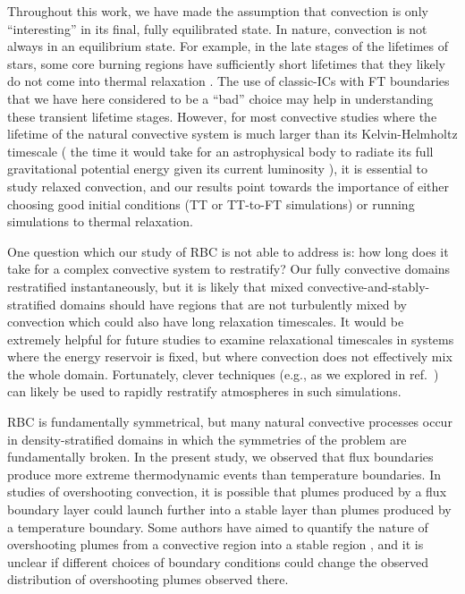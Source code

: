 \documentclass[aps, pre, onecolumn, nofootinbib, notitlepage, groupedaddress, amsfonts, amssymb, amsmath, longbibliography, superscriptaddress]{revtex4-1}
\newcommand{\ea}[1]{{\color{red} #1}}
\begin{document}
Throughout this work, we have made the assumption that convection is only ``interesting'' in its final, fully equilibrated state.
In nature, convection is not always in an equilibrium state.
For example, in the late stages of the lifetimes of stars, some core burning regions have sufficiently short lifetimes that they likely do not come into thermal relaxation \citep{clarkson&all2018, andrassy&all2020}.
The use of classic-ICs with FT boundaries that we have here considered to be a ``bad'' choice may help in understanding these transient lifetime stages.
However, for most convective studies where the lifetime of the natural convective system is much larger than its Kelvin-Helmholtz timescale (\ea{the time it would take for an astrophysical body to radiate its full gravitational potential energy given its current luminosity \cite{carroll&ostlie}}), it is essential to study relaxed convection, and our results point towards the importance of either choosing good initial conditions (TT or TT-to-FT simulations) or running simulations to thermal relaxation.

One question which our study of RBC is not able to address is: how long does it take for a complex convective system to restratify?
Our fully convective domains restratified instantaneously, but it is likely that mixed convective-and-stably-stratified domains \citep{brummell&all2002, kapyla&all2019, pratt&all2017, korre&all2019} should have regions that are not turbulently mixed by convection which could also have long relaxation timescales.
It would be extremely helpful for future studies to examine relaxational timescales in systems where the energy reservoir is fixed, but where convection does not effectively mix the whole domain.
Fortunately, clever techniques (e.g., as we explored in ref.~\cite{anders&all2018}) can likely be used to rapidly restratify atmospheres in such simulations.

RBC is fundamentally symmetrical, but many natural convective processes occur in density-stratified domains in which the symmetries of the problem are fundamentally broken.
In the present study, we observed that flux boundaries produce more extreme thermodynamic events than temperature boundaries.
In studies of overshooting convection, it is possible that plumes produced by a flux boundary layer could launch further into a stable layer than plumes produced by a temperature boundary.
Some authors have aimed to quantify the nature of overshooting plumes from a convective region into a stable region \cite{pratt&all2017, korre&all2019}, and it is unclear if different choices of boundary conditions could change the observed distribution of overshooting plumes observed there.
\end{document}
